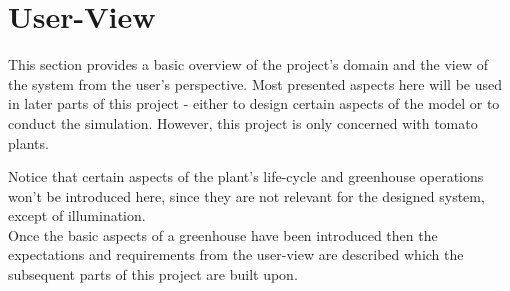 \section{User-View}\label{sec:user-view}


This section provides a basic overview of the project's domain and the view of the system from the user's perspective.
Most presented aspects here will be used in later parts of this project - either to design certain aspects of the model
or to conduct the simulation.
However, this project is only concerned with tomato plants.

Notice that certain aspects of the plant's life-cycle and greenhouse operations won't be introduced here,
since they are not relevant for the designed system, except of illumination.\\

Once the basic aspects of a greenhouse have been introduced then the expectations and requirements
from the user-view are described which the subsequent parts of this project are built upon.